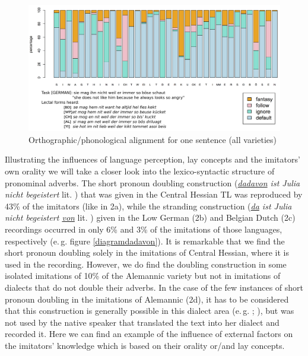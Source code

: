\documentclass[output=paper]{LSP/langsci}
\begin{document}
\begin{figure}[h!]
\centering

\includegraphics[width=\textwidth]{illustrations/schaf_etal_fig2}%
\caption{\label{alignment1}Orthographic/phonological alignment for one sentence (all varieties)}
	\end{figure}
\FloatBarrier

Illustrating the influences of language perception, lay concepts and the imitators’ own orality we will take a closer look into the lexico-syntactic structure of pronominal adverbs. The short pronoun doubling construction (\textit{\underline{dadavon} ist Julia nicht begeistert}  lit. ) that was given in the Central Hessian TL was reproduced by 43\% of the imitators (like in 2a), while the stranding construction (\textit{\underline{da} ist Julia nicht begeistert \underline{von}} lit. ) given in the Low German (2b) and Belgian Dutch (2c) recordings occurred in only  6\% and 3\% of the imitations of those languages, respectively (e.\,g. figure \ref{diagramdadavon}).  It is remarkable that we find the short pronoun doubling solely in the imitations of Central Hessian, where it is used in the recording. However, we do find the doubling construction in some isolated imitations of 10\% of the Alemannic variety but not in imitations of dialects that do not double their adverbs. In the case of the few instances of short pronoun doubling in the imitations of Alemannic (2d), it has to be considered that this construction is generally possible in this dialect area (e.\,g. \cite{fleischer_syntax_2002}; \cite[Round 1 Questions 11, 12; Round 2 Question 21]{ADA}), but was not used by the native speaker that translated the text into her dialect and recorded it. Here we can find an example of the influence of external factors on the imitators’ knowledge which is based on their orality or/and lay concepts.
\end{document}
